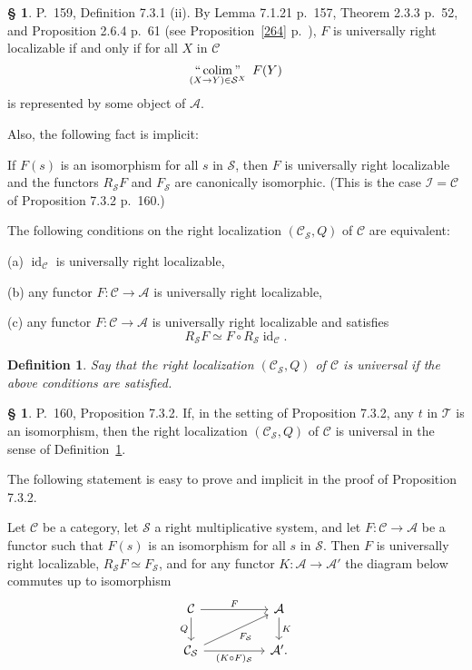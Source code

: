 \documentclass[12pt]{article}
\newtheorem{df}[thm]{Definition}%
\theoremstyle{remark}
\theoremstyle{definition}
\newtheorem{s}[thm]{\S}
\newcommand{\cc}{\mathcal}
\newcommand{\A}{\mathcal A}
\newcommand{\C}{\mathcal C}
\newcommand{\SSS}{\mathcal S}
\DeclareMathOperator*{\coli}{colim}
\DeclareMathOperator*{\icolim}{``\coli"}
\DeclareMathOperator{\id}{id}
\begin{document}
\begin{s} 
P.~159, Definition 7.3.1 (ii). By Lemma 7.1.21 p.~157, Theorem 2.3.3 p.~52, and Proposition 2.6.4 p.~61 (see Proposition~\ref{264} p.~\pageref{264}), $F$ is universally right localizable if and only if for all $X$ in $\C$ 
$$
\icolim_{(X\to Y)\in\SSS^X}\ F(Y) 
$$
is represented by some object of $\A$. 

Also, the following fact is implicit:

If $F(s)$ is an isomorphism for all $s$ in $\cc S$, then $F$ is universally right localizable and the functors $R_{\cc S}F$ and $F_{\cc S}$ are canonically isomorphic. (This is the case $\cc I=\C$ of Proposition 7.3.2 p.~160.)

The following conditions on the right localization $(\C_{\cc S},Q)$ of $\C$ are equivalent: 

\noindent(a) $\id_\C$ is universally right localizable, 

\noindent(b) any functor $F:\C\to\A$ is universally right localizable, 

\noindent(c) any functor $F:\C\to\A$ is universally right localizable and satisfies 
$$
R_{\cc S}F\simeq F\circ R_{\cc S}\id_\C.
$$
%
\begin{df}\label{url}
Say that the right localization $(\C_{\cc S},Q)$ of $\C$ is {\em universal} if the above conditions are satisfied.
\end{df}
\end{s}
%
%
\begin{s}\label{732} 
P.~160, Proposition 7.3.2. If, in the setting of Proposition 7.3.2, any $t$ in $\cc T$ is an isomorphism, then the right localization $(\C_{\cc S},Q)$ of $\C$ is universal in the sense of Definition~\ref{url}.

The following statement is easy to prove and implicit in the proof of Proposition 7.3.2. 

Let $\C$ be a category, let $\SSS$ a right multiplicative system, and let $F:\C\to\A$ be a functor such that $F(s)$ is an isomorphism for all $s$ in $\SSS$. Then $F$ is universally right localizable, $R_{\SSS}F\simeq F_{\SSS}$, and for any functor $K:\A\to\A'$ the diagram below commutes up to isomorphism
$$
\begin{tikzcd}
\C\ar{rr}{F}\ar{d}[swap]{Q}&&\A\ar{d}{K}\\
\C_{\SSS}\ar{rr}[swap]{(K\circ F)_{\SSS}}\ar{rru}[swap]{F_{\SSS}}&&\A'.
\end{tikzcd}
$$
\end{s}
%
%
\end{document}
